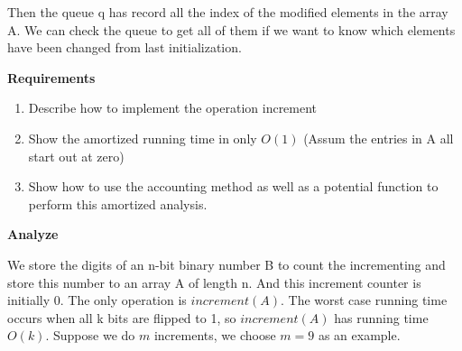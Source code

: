 \begin{homeworkProblem}
Then the queue q has record all the index of the modified elements in the array A. We can check the queue to get all of them if we want to know which elements have been changed from last initialization.




\end{homeworkProblem}

\pagebreak

\begin{homeworkProblem}

\textbf{Requirements}
    \begin{enumerate}
        \item Describe how to implement the operation increment
        \item Show the amortized running time in only $O(1)$ (Assum the entries in A all start out at zero)
        \item Show how to use the accounting method as well as a potential function to perform this amortized analysis.
    \end{enumerate}

\textbf{Analyze}

We store the digits of an n-bit binary number B to count the incrementing and store this number to an array A of length n. And this increment counter is initially 0. The only operation is $increment(A)$. The worst case running time occurs when all k bits are flipped to 1, so $increment(A)$ has running time $O(k)$. Suppose we do $m$ increments, we choose $m = 9$ as an example.


\end{homeworkProblem}
